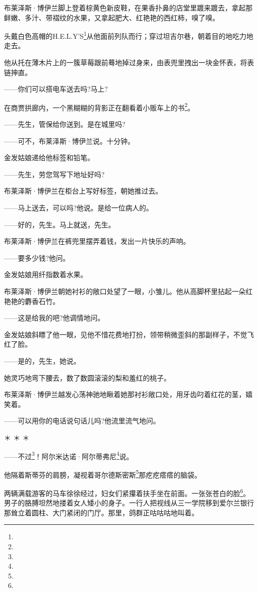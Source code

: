 \par 布莱泽斯·博伊兰脚上登着棕黄色新皮鞋，在果香扑鼻的店堂里踱来踱去，拿起那鲜嫩、多汁、带褶纹的水果，又拿起肥大、红艳艳的西红柿，嗅了嗅。
\par 头戴白色高帽的H.E.L.Y’S\footnote{}从他面前列队而行；穿过坦吉尔巷，朝着目的地吃力地走去。
\par 他从托在薄木片上的一簇草莓跟前蓦地掉过身来，由表兜里拽出一块金怀表，将表链抻直。
\par ——你们可以搭电车送去吗?马上?
\par 在商贾拱廊内，一个黑糊糊的背影正在翻看着小贩车上的书\footnote{}。
\par ——先生，管保给你送到。是在城里吗?
\par ——可不，布莱泽斯·博伊兰说。十分钟。
\par 金发姑娘递给他标签和铅笔。
\par ——先生，劳您驾写下地址好吗?
\par 布莱泽斯·博伊兰在柜台上写好标签，朝她推过去。
\par ——马上送去，可以吗?他说。是给一位病人的。
\par ——好的，先生。马上就送，先生。
\par 布莱泽斯·博伊兰在裤兜里摆弄着钱，发出一片快乐的声响。
\par ——要多少钱?他问。
\par 金发姑娘用纤指数着水果。
\par 布莱泽斯·博伊兰朝她衬衫的敞口处望了一眼，小雏儿。他从高脚杯里拈起一朵红艳艳的麝香石竹。
\par ——这是给我的吧?他调情地问。
\par 金发姑娘斜瞟了他一眼，见他不惜花费地打扮，领带稍微歪斜的那副样子，不觉飞红了脸。
\par ——是的，先生，她说。
\par 她灵巧地弯下腰去，数了数圆滚滚的梨和羞红的桃子。
\par 布莱泽斯·博伊兰越发心荡神驰地瞅着她那衬衫敞口处，用牙齿叼着红花的茎，嬉笑着。
\par ——可以用你的电话说句话儿吗?他流里流气地问。
\par ＊ ＊ ＊
\par ——不过\footnote{}！阿尔米达诺·阿尔蒂弗尼\footnote{}说。
\par 他隔着斯蒂芬的肩膀，凝视着哥尔德斯密斯\footnote{}那疙疙瘩瘩的脑袋。
\par 两辆满载游客的马车徐徐经过，妇女们紧攥着扶手坐在前面。一张张苍白的脸\footnote{}。男子的胳膊坦然地搂着女人矮小的身子。一行人把视线从三一学院移到爱尔兰银行那耸立着圆柱、大门紧闭的门厅。那里，鸽群正咕咕咕地叫着。
